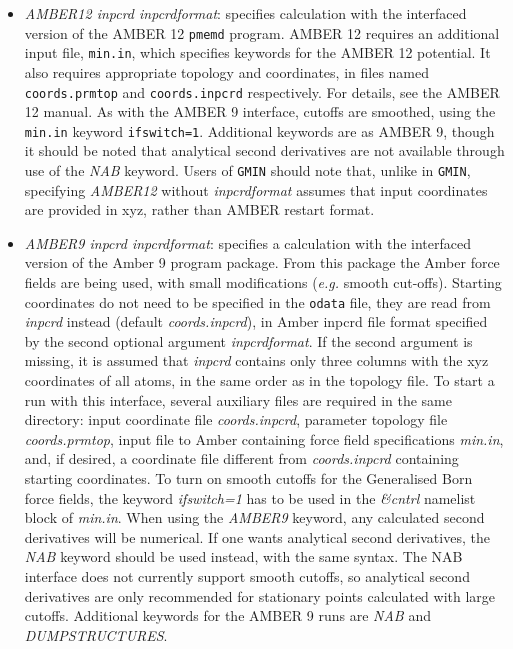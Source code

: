 \documentclass[12pt,a4paper,dvips]{article}
\begin{document}
\begin{itemize}
\item {\it AMBER12 inpcrd inpcrdformat\/}: specifies calculation with the interfaced version of the AMBER 12 
{\tt pmemd} program. AMBER 12 requires an additional input file, {\tt min.in}, which specifies
keywords for the AMBER 12 potential. It also requires appropriate topology and coordinates, in files
named {\tt coords.prmtop} and {\tt coords.inpcrd} respectively. For details, see the AMBER 12 manual.
As with the AMBER 9 interface, cutoffs are smoothed, using the {\tt min.in} keyword {\tt ifswitch=1}.
Additional keywords are as AMBER 9, though it should be noted that analytical second derivatives are not
available through use of the {\it NAB} keyword.
Users of {\tt GMIN} should note that, unlike in {\tt GMIN}, specifying {\it AMBER12} without {\it inpcrdformat}
assumes that input coordinates are provided in xyz, rather than AMBER restart format.

\item {\it AMBER9 inpcrd inpcrdformat\/}: specifies a calculation with the interfaced 
version of the Amber 9 program package. From this package the Amber force fields 
are being used, with small modifications ({\it e.g.} smooth cut-offs). 
Starting coordinates do not need to be specified in the {\tt odata} file, they
are read from {\it inpcrd} instead (default {\it coords.inpcrd}), in Amber inpcrd 
file format specified by the second optional argument {\it inpcrdformat}.
If the second argument is missing, it is assumed that {\it inpcrd} contains
only three columns with the xyz coordinates of all atoms, in the same order 
as in the topology file. To start a run with this interface, 
several auxiliary files are required in the same directory: input coordinate file
{\it coords.inpcrd}, parameter topology file {\it coords.prmtop}, 
input file to Amber containing force field specifications {\it min.in}, and, if 
desired, a coordinate file different from {\it coords.inpcrd} containing 
starting coordinates.
To turn on smooth cutoffs for the Generalised Born force fields, the keyword 
{\it ifswitch=1} has to be used in the {\it \&cntrl} namelist block of {\it min.in}.
When using the {\it AMBER9} keyword, any calculated second derivatives will be 
numerical. If one wants analytical second derivatives, the {\it NAB} keyword 
should be used instead, with the same syntax. The NAB interface does not 
currently support smooth cutoffs, so analytical second derivatives are only 
recommended for stationary points calculated with large cutoffs.
Additional keywords for the AMBER 9 runs are {\it NAB} and {\it DUMPSTRUCTURES}.


\end{itemize}
\end{document}
